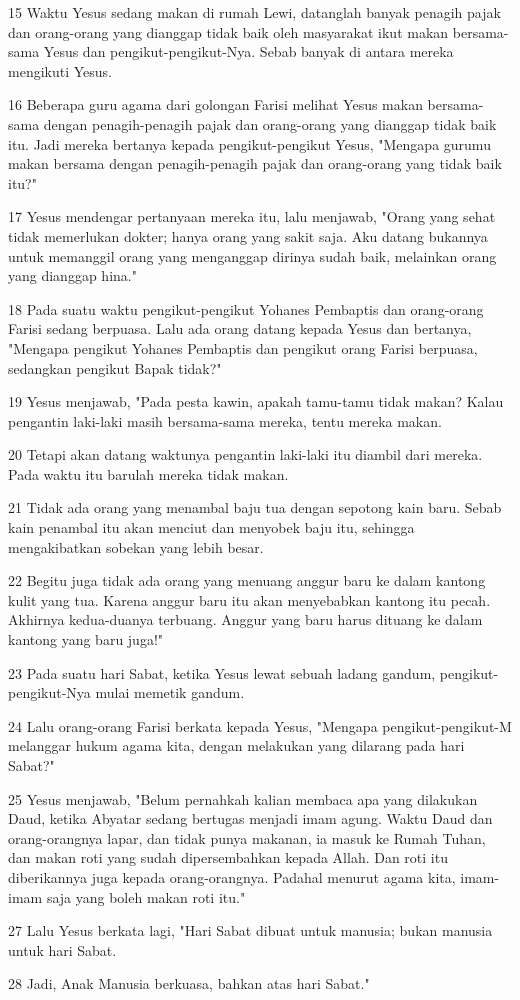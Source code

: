 \par 15 Waktu Yesus sedang makan di rumah Lewi, datanglah banyak penagih pajak dan orang-orang yang dianggap tidak baik oleh masyarakat ikut makan bersama-sama Yesus dan pengikut-pengikut-Nya. Sebab banyak di antara mereka mengikuti Yesus.
\par 16 Beberapa guru agama dari golongan Farisi melihat Yesus makan bersama-sama dengan penagih-penagih pajak dan orang-orang yang dianggap tidak baik itu. Jadi mereka bertanya kepada pengikut-pengikut Yesus, "Mengapa gurumu makan bersama dengan penagih-penagih pajak dan orang-orang yang tidak baik itu?"
\par 17 Yesus mendengar pertanyaan mereka itu, lalu menjawab, "Orang yang sehat tidak memerlukan dokter; hanya orang yang sakit saja. Aku datang bukannya untuk memanggil orang yang menganggap dirinya sudah baik, melainkan orang yang dianggap hina."
\par 18 Pada suatu waktu pengikut-pengikut Yohanes Pembaptis dan orang-orang Farisi sedang berpuasa. Lalu ada orang datang kepada Yesus dan bertanya, "Mengapa pengikut Yohanes Pembaptis dan pengikut orang Farisi berpuasa, sedangkan pengikut Bapak tidak?"
\par 19 Yesus menjawab, "Pada pesta kawin, apakah tamu-tamu tidak makan? Kalau pengantin laki-laki masih bersama-sama mereka, tentu mereka makan.
\par 20 Tetapi akan datang waktunya pengantin laki-laki itu diambil dari mereka. Pada waktu itu barulah mereka tidak makan.
\par 21 Tidak ada orang yang menambal baju tua dengan sepotong kain baru. Sebab kain penambal itu akan menciut dan menyobek baju itu, sehingga mengakibatkan sobekan yang lebih besar.
\par 22 Begitu juga tidak ada orang yang menuang anggur baru ke dalam kantong kulit yang tua. Karena anggur baru itu akan menyebabkan kantong itu pecah. Akhirnya kedua-duanya terbuang. Anggur yang baru harus dituang ke dalam kantong yang baru juga!"
\par 23 Pada suatu hari Sabat, ketika Yesus lewat sebuah ladang gandum, pengikut-pengikut-Nya mulai memetik gandum.
\par 24 Lalu orang-orang Farisi berkata kepada Yesus, "Mengapa pengikut-pengikut-M melanggar hukum agama kita, dengan melakukan yang dilarang pada hari Sabat?"
\par 25 Yesus menjawab, "Belum pernahkah kalian membaca apa yang dilakukan Daud, ketika Abyatar sedang bertugas menjadi imam agung. Waktu Daud dan orang-orangnya lapar, dan tidak punya makanan, ia masuk ke Rumah Tuhan, dan makan roti yang sudah dipersembahkan kepada Allah. Dan roti itu diberikannya juga kepada orang-orangnya. Padahal menurut agama kita, imam-imam saja yang boleh makan roti itu."
\par 27 Lalu Yesus berkata lagi, "Hari Sabat dibuat untuk manusia; bukan manusia untuk hari Sabat.
\par 28 Jadi, Anak Manusia berkuasa, bahkan atas hari Sabat."

